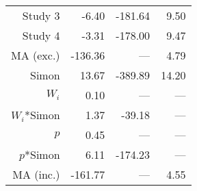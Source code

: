 \begin{table}[!h]
{\begin{tabular}[t]{rrrr}
\hspace{1em}Study 3 & -6.40 & -181.64 & 9.50\\
\hspace{1em}Study 4 & -3.31 & -178.00 & 9.47\\
\hspace{1em}MA (exc.) & -136.36 & --- & 4.79\\
\hspace{1em}Simon & 13.67 & -389.89 & 14.20\\
\hspace{1em}$W_i$ & 0.10 & --- & ---\\
\hspace{1em}$W_i$*Simon & 1.37 & -39.18 & ---\\
\hspace{1em}$p$ & 0.45 & --- & ---\\
\hspace{1em}$p$*Simon & 6.11 & -174.23 & ---\\
\hspace{1em}MA (inc.) & -161.77 & --- & 4.55\\
\bottomrule
\end{tabular}}
\end{table}
